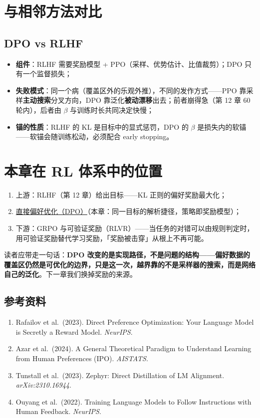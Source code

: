 \documentclass{article}
\begin{document}
\section*{与相邻方法对比}

\subsection*{DPO vs RLHF}

\begin{itemize}
  \item \textbf{组件}：RLHF 需要奖励模型 + PPO（采样、优势估计、比值裁剪）；DPO 只有一个监督损失；
  \item \textbf{失败模式}：同一个病（覆盖区外的乐观外推），不同的发作方式——PPO 靠采样\textbf{主动搜索}分叉方向，DPO 靠泛化\textbf{被动漂移}出去；前者崩得急（第 12 章 60 轮内），后者由 $\beta$ 与训练时长共同决定快慢；
  \item \textbf{锚的性质}：RLHF 的 KL 是目标中的显式惩罚，DPO 的 $\beta$ 是损失内的软锚——软锚会随训练松动，必须配合 early stopping。
\end{itemize}

\section*{本章在 RL 体系中的位置}

\begin{enumerate}
  \item 上游：RLHF（第 12 章）给出目标——KL 正则的偏好奖励最大化；
  \item \underline{直接偏好优化（DPO）}（本章：同一目标的解析捷径，策略即奖励模型）；
  \item 下游：GRPO 与可验证奖励（RLVR）——当任务的对错可以由规则判定时，用可验证奖励替代学习奖励，「奖励被击穿」从根上不再可能。
\end{enumerate}

读者应带走一句话：\textbf{DPO 改变的是实现路径，不是问题的结构——偏好数据的覆盖区仍然是可优化的边界，只是这一次，越界靠的不是采样器的搜索，而是网络自己的泛化}。下一章我们换掉奖励的来源。

\subsection*{参考资料}

\begin{enumerate}
  \item Rafailov et al.\ (2023). Direct Preference Optimization: Your Language Model is Secretly a Reward Model. \textit{NeurIPS}.
  \item Azar et al.\ (2024). A General Theoretical Paradigm to Understand Learning from Human Preferences (IPO). \textit{AISTATS}.
  \item Tunstall et al.\ (2023). Zephyr: Direct Distillation of LM Alignment. \textit{arXiv:2310.16944}.
  \item Ouyang et al.\ (2022). Training Language Models to Follow Instructions with Human Feedback. \textit{NeurIPS}.
\end{enumerate}
\end{document}
